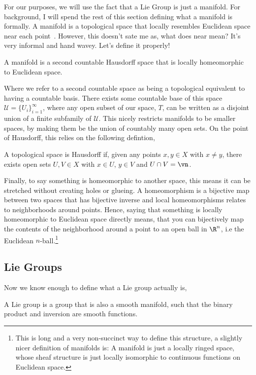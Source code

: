 \noindent
For our purposes, we will use the fact that a Lie Group is just a manifold. For background, I will spend the rest of this section defining what a manifold is formally. A manifold is a topological space that locally resembles Euclidean space near each point~\cite{wmwMan}. However, this doesn't sate me as, what does near mean? It's very informal and hand wavey. Let's define it properly!
\begin{ndefi}[Manifold]
  A manifold is a second countable Hausdorff space that is locally homeomorphic to Euclidean space.
\end{ndefi}

\noindent
Where we refer to a second countable space as being a topological equivalent to having a countable basis. There exists some countable base of this space $\mathcal{U} = \{U_i\}_{i=1}^\infty$, where any open subset of our space, $T$, can be written as a disjoint union of a finite subfamily of $\mathcal{U}$. This nicely restricts manifolds to be smaller spaces, by making them be the union of countably many open sets. On the point of Hausdorff, this relies on the following defintion,
\begin{ndefi}[Hausdorff]
  A topological space is Hausdorff if, given any points $x, y \in X$ with $x \ne y$, there exists open sets $U, V \in X$ with $x \in U$, $y \in V$ and $U \cap V = \vn$.
\end{ndefi}

\noindent
Finally, to say something is homeomorphic to another space, this means it can be stretched without creating holes or glueing. A homeomorphism is a bijective map between two spaces that has bijective inverse and local homeomorphisms relates to neighborhoods around points. Hence, saying that something is locally homeomorphic to Euclidean space directly means, that you can bijectively map the contents of the neighborhood around a point to an open ball in $\R^n$, i.e the Euclidean $n$-ball.\footnote{This is long and a very non-succinct way to define this structure, a slightly nicer definition of manifolds is: A manifold is just a locally ringed space, whose sheaf structure is just locally isomorphic to continuous functions on Euclidean space.}

\noindent
\subsection{Lie Groups}
Now we know enough to define what a Lie group actually is,
\begin{ndefi}
  A Lie group is a group that is also a smooth manifold, such that the binary product and inversion are smooth functions.
\end{ndefi}

